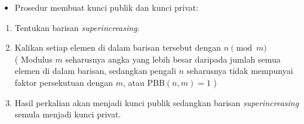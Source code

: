\documentclass{article}
\begin{document}

\begin{itemize}
    \item Prosedur membuat kunci publik dan kunci privat:
\end{itemize}

\begin{enumerate}
    \item Tentukan barisan \textit{superincreasing}.
    \item Kalikan setiap elemen di dalam barisan tersebut dengan $n \pmod{m}$ \\ ( Modulus $m$ seharusnya angka yang lebih besar daripada jumlah semua elemen di dalam barisan, sedangkan pengali $n$ seharusnya tidak mempunyai faktor persekutuan dengan $m$, atau $\text{PBB}(n, m) = 1$ )
    \item Hasil perkalian akan menjadi kunci publik sedangkan barisan \textit{superincreasing} semula menjadi kunci privat.
\end{enumerate}
\end{document}
